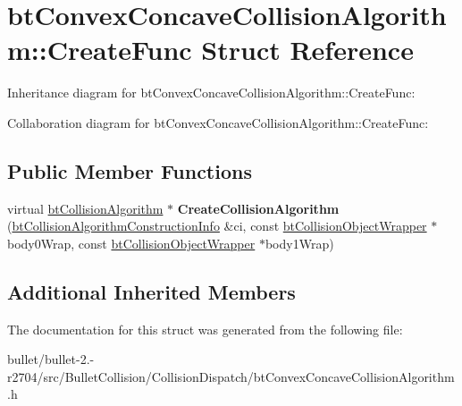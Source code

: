 \hypertarget{structbt_convex_concave_collision_algorithm_1_1_create_func}{\section{bt\+Convex\+Concave\+Collision\+Algorithm\+:\+:Create\+Func Struct Reference}
\label{structbt_convex_concave_collision_algorithm_1_1_create_func}
}


Inheritance diagram for bt\+Convex\+Concave\+Collision\+Algorithm\+:\+:Create\+Func\+:


Collaboration diagram for bt\+Convex\+Concave\+Collision\+Algorithm\+:\+:Create\+Func\+:
\subsection*{Public Member Functions}
\begin{DoxyCompactItemize}
\item 
\hypertarget{structbt_convex_concave_collision_algorithm_1_1_create_func_a20a1e48c6c21b4f8cd07727c6615536b}{virtual \hyperlink{classbt_collision_algorithm}{bt\+Collision\+Algorithm} $\ast$ {\bfseries Create\+Collision\+Algorithm} (\hyperlink{structbt_collision_algorithm_construction_info}{bt\+Collision\+Algorithm\+Construction\+Info} \&ci, const \hyperlink{structbt_collision_object_wrapper}{bt\+Collision\+Object\+Wrapper} $\ast$body0\+Wrap, const \hyperlink{structbt_collision_object_wrapper}{bt\+Collision\+Object\+Wrapper} $\ast$body1\+Wrap)}\label{structbt_convex_concave_collision_algorithm_1_1_create_func_a20a1e48c6c21b4f8cd07727c6615536b}

\end{DoxyCompactItemize}
\subsection*{Additional Inherited Members}


The documentation for this struct was generated from the following file\+:\begin{DoxyCompactItemize}
\item 
bullet/bullet-\/2.-\/r2704/src/\+Bullet\+Collision/\+Collision\+Dispatch/bt\+Convex\+Concave\+Collision\+Algorithm.\+h\end{DoxyCompactItemize}
